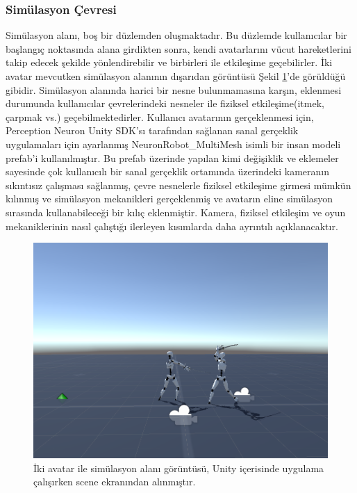 \documentclass[a4paper, 12pt, titlepage]{article}
\begin{document}
\subsubsection{Simülasyon Çevresi}

Simülasyon alanı, boş bir düzlemden oluşmaktadır. Bu düzlemde kullanıcılar bir başlangıç noktasında
alana girdikten sonra, kendi avatarlarını vücut hareketlerini takip edecek şekilde yönlendirebilir
ve birbirleri ile etkileşime geçebilirler. İki avatar mevcutken simülasyon alanının dışarıdan
görüntüsü Şekil \ref{env}’de görüldüğü gibidir. Simülasyon alanında harici bir nesne bulunmamasına
karşın, eklenmesi durumunda kullanıcılar çevrelerindeki nesneler ile fiziksel etkileşime(itmek,
çarpmak vs.) geçebilmektedirler. Kullanıcı avatarının gerçeklenmesi için, Perception Neuron Unity
SDK’sı tarafından sağlanan sanal gerçeklik uygulamaları için ayarlanmış NeuronRobot\_MultiMesh isimli
bir insan modeli prefab’i kullanılmıştır. Bu prefab üzerinde yapılan kimi değişiklik ve eklemeler
sayesinde çok kullanıcılı bir sanal gerçeklik ortamında üzerindeki kameranın sıkıntısız çalışması
sağlanmış, çevre nesnelerle fiziksel etkileşime girmesi mümkün kılınmış ve simülasyon mekanikleri
gerçeklenmiş ve avatarın eline simülasyon sırasında kullanabileceği bir kılıç eklenmiştir. Kamera,
fiziksel etkileşim ve oyun mekaniklerinin nasıl çalıştığı ilerleyen kısımlarda daha ayrıntılı
açıklanacaktır.

\begin{figure}[ht!]
    \centering
        \includegraphics[width=6in]{images/env2}
    \caption{İki avatar ile simülasyon alanı görüntüsü, Unity içerisinde uygulama çalışırken scene
             ekranından alınmıştır.}
    \label{env}
\end{figure}
\end{document}
